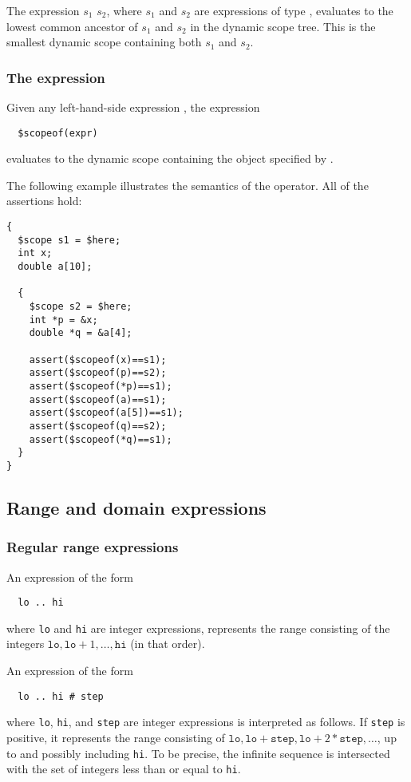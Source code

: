 The expression $s_1$ \ct{+} $s_2$, where $s_1$ and $s_2$ are
expressions of type \cscope, evaluates to the lowest common ancestor
of $s_1$ and $s_2$ in the dynamic scope tree. This is the smallest
dynamic scope containing both $s_1$ and $s_2$.

\subsubsection{The \cscopeof{} expression}

Given any left-hand-side expression , the expression
\begin{verbatim}
  $scopeof(expr)
\end{verbatim}
evaluates to the dynamic scope containing the object specified by
.

The following example illustrates the semantics of the \cscopeof{}
operator.  All of the assertions hold:
\begin{verbatim}
{
  $scope s1 = $here;
  int x;
  double a[10];

  {
    $scope s2 = $here;
    int *p = &x;
    double *q = &a[4];

    assert($scopeof(x)==s1);
    assert($scopeof(p)==s2);
    assert($scopeof(*p)==s1);
    assert($scopeof(a)==s1);
    assert($scopeof(a[5])==s1);
    assert($scopeof(q)==s2);
    assert($scopeof(*q)==s1);
  }
}  
\end{verbatim}

\subsection{Range and domain expressions}

\subsubsection{Regular range expressions}
\label{sec:range_expr}

An expression of the form
\begin{verbatim}
  lo .. hi
\end{verbatim}
where \texttt{lo} and \texttt{hi} are integer expressions, represents
the range consisting of the integers $\texttt{lo}, \texttt{lo}+1,
\ldots, \texttt{hi}$ (in that order).

An expression of the form
\begin{verbatim}
  lo .. hi # step
\end{verbatim}
where \texttt{lo}, \texttt{hi}, and \texttt{step} are integer
expressions is interpreted as follows.  If \texttt{step} is positive,
it represents the range consisting of $\texttt{lo},
\texttt{lo}+\texttt{step}, \texttt{lo}+2*\texttt{step}, \ldots$, up to
and possibly including \texttt{hi}.  To be precise, the infinite
sequence is intersected with the set of integers less than or equal to
\texttt{hi}.

